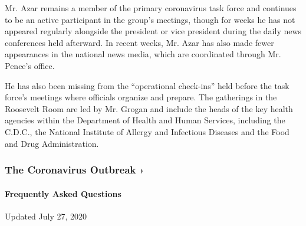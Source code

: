 Mr. Azar remains a member of the primary coronavirus task force and
continues to be an active participant in the group's meetings, though
for weeks he has not appeared regularly alongside the president or vice
president during the daily news conferences held afterward. In recent
weeks, Mr. Azar has also made fewer appearances in the national news
media, which are coordinated through Mr. Pence's office.

He has also been missing from the ``operational check-ins'' held before
the task force's meetings where officials organize and prepare. The
gatherings in the Roosevelt Room are led by Mr. Grogan and include the
heads of the key health agencies within the Department of Health and
Human Services, including the C.D.C., the National Institute of Allergy
and Infectious Diseases and the Food and Drug Administration.

\href{https://www.nytimes.com/news-event/coronavirus?action=click\&pgtype=Article\&state=default\&region=MAIN_CONTENT_3\&context=storylines_faq}{}

\hypertarget{the-coronavirus-outbreak-}{%
\subsubsection{The Coronavirus Outbreak
›}\label{the-coronavirus-outbreak-}}

\hypertarget{frequently-asked-questions}{%
\paragraph{Frequently Asked
Questions}\label{frequently-asked-questions}}

Updated July 27, 2020

